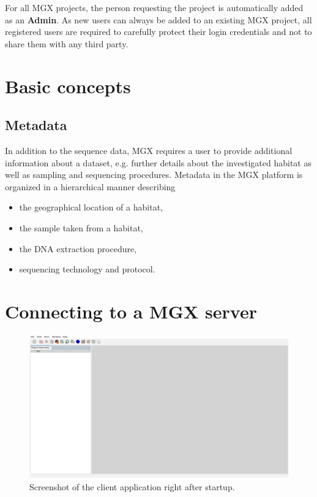 \noindent
For all MGX projects, the person requesting the project is automatically added as an \textbf{Admin}.
As new users can always be added to an existing MGX project, all registered users are required
to carefully protect their login credentials and not to share them with any third party.

\section{Basic concepts}
\subsection{Metadata}

In addition to the sequence data, MGX requires a user to provide additional information
about a dataset, e.g. further details about the investigated habitat as well as sampling
and sequencing procedures. Metadata in the MGX platform is organized in a hierarchical
manner describing

\begin{itemize}
  \item the geographical location of a habitat,
  \item the sample taken from a habitat,
  \item the DNA extraction procedure,
  \item sequencing technology and protocol.
\end{itemize}

\section{Connecting to a MGX server}

\begin{figure}[H]
\centering
\includegraphics[width=\textwidth]{img/mgx/startup}
\caption[MGX client]{Screenshot of the client application right after startup.}
\label{startup}
\end{figure}

